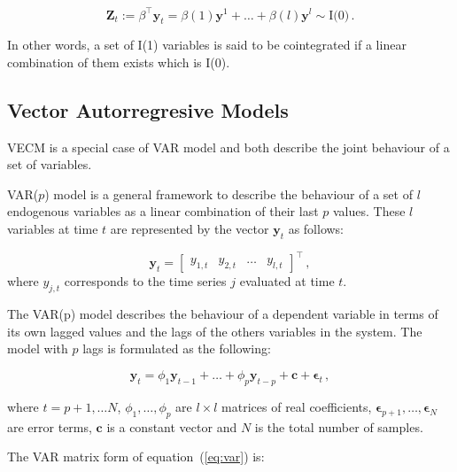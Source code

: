 \begin{equation}
 \mathbf{Z}_t:= \beta^\top \mathbf{y}_t = \beta(1) \mathbf{y}^1 + \dots + \beta(l) \mathbf{y}^l \sim
 \text{I(0)}\, .
\end{equation}

In other words, a set of I(1) variables is said to be cointegrated if
a linear combination of them exists which is I(0).


\subsection{Vector Autorregresive Models}\label{sec:varvec}

VECM is a special case of VAR model and both describe the joint behaviour of a
set of variables.

VAR($p$) model is a general framework to describe the behaviour of a set of $l$
endogenous variables as a linear combination of their last $p$ values. These
$l$ variables at time $t$ are represented by the vector $\mathbf{y}_t$ as
follows:

\begin{equation}
\label{eq:variables}
\mathbf{y}_t = 
\begin{bmatrix} y_{1,t} &
y_{2,t} &
\dots &
y_{l,t}
\end{bmatrix}^\top \, ,
\end{equation}
\noindent where $y_{j,t}$ corresponds to the time series $j$ evaluated at
time $t$.

The VAR(p) model describes the behaviour of a dependent variable in terms
of its own lagged values and the lags of the others variables in the
system. The model with $p$ lags is formulated as the following:

\begin{equation}
\label{eq:var}
 \mathbf{y}_t = \phi_1 \mathbf{y}_{t-1}  + \dots +   \phi_p\mathbf{y}_{t-p}
+ \mathbf{c} + \mathbf{\epsilon}_t \, ,
\end{equation}

\noindent where $t=p+1, \dots N$,  ${\phi_1,\dots,\phi_p}$ are $l \times l$
matrices of real coefficients,
$\mathbf{\epsilon}_{p+1},\dots,\mathbf{\epsilon}_N$ are error terms,
$\mathbf{c}$ is a constant vector and $N$ is the total number of samples.

The VAR matrix form of equation~(\ref{eq:var}) is:

